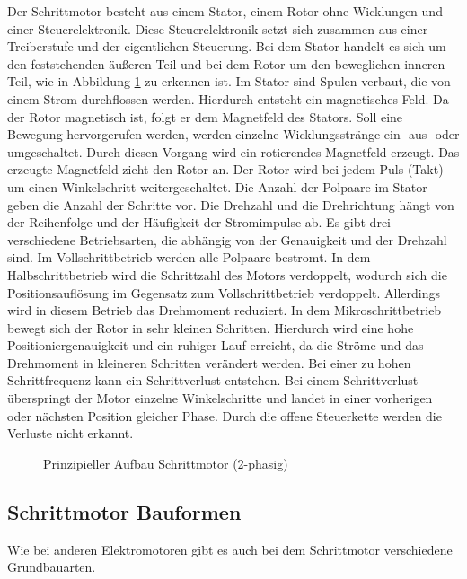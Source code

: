 Der Schrittmotor besteht aus einem Stator, einem Rotor ohne Wicklungen und einer Steuerelektronik. Diese Steuerelektronik setzt sich zusammen aus einer Treiberstufe und der eigentlichen Steuerung. Bei dem Stator handelt es sich um den feststehenden äußeren Teil und bei dem Rotor um den beweglichen inneren Teil, wie in Abbildung \ref{HaPrSchritt} zu erkennen ist. Im Stator sind Spulen verbaut, die von einem Strom durchflossen werden. Hierdurch entsteht ein magnetisches Feld. Da der Rotor magnetisch ist, folgt er dem Magnetfeld des Stators. Soll eine Bewegung hervorgerufen werden, werden einzelne Wicklungsstränge ein- aus- oder umgeschaltet. Durch diesen Vorgang wird ein rotierendes Magnetfeld erzeugt. Das erzeugte Magnetfeld zieht den Rotor an. Der Rotor wird bei jedem Puls (Takt) um einen Winkelschritt weitergeschaltet. Die Anzahl der Polpaare im Stator geben die Anzahl der Schritte vor. Die Drehzahl und die Drehrichtung hängt von der Reihenfolge und der Häufigkeit der Stromimpulse ab. Es gibt drei verschiedene Betriebsarten, die abhängig von der Genauigkeit und der Drehzahl sind. Im Vollschrittbetrieb werden alle Polpaare bestromt. In dem Halbschrittbetrieb wird die Schrittzahl des Motors verdoppelt, wodurch sich die Positionsauflösung im Gegensatz zum Vollschrittbetrieb verdoppelt. Allerdings wird in diesem Betrieb das Drehmoment reduziert. In dem Mikroschrittbetrieb bewegt sich der Rotor in sehr kleinen Schritten. Hierdurch wird eine hohe Positioniergenauigkeit und ein ruhiger Lauf erreicht, da die Ströme und das Drehmoment in kleineren Schritten verändert werden. Bei einer zu hohen Schrittfrequenz kann ein Schrittverlust entstehen. Bei einem Schrittverlust überspringt der Motor einzelne Winkelschritte und landet in einer vorherigen oder nächsten Position gleicher Phase. Durch die offene Steuerkette werden die Verluste nicht erkannt.\cite{Hagl.2021}\cite{Bernstein.2018}\cite{Schroder.2021}

\begin{figure}[H]
	\begin{center}
		
		\caption{Prinzipieller Aufbau Schrittmotor (2-phasig) \cite{Hagl.2021}} \label{HaPrSchritt}
	\end{center}
\end{figure}

\subsection{Schrittmotor Bauformen}

Wie bei anderen Elektromotoren gibt es auch bei dem Schrittmotor verschiedene Grundbauarten. 

